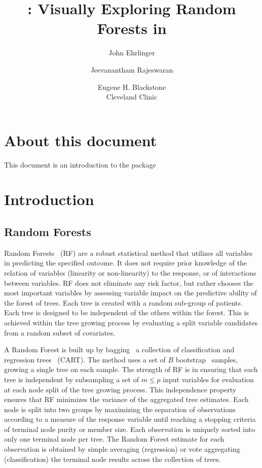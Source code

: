 \documentclass[nojss]{jss}\usepackage[]{graphicx}\usepackage[]{color}
\author{John Ehrlinger \and Jeevanantham Rajeswaran
\and Eugene H. Blackstone\\Cleveland Clinic}
\title{{\pkg{ggRandomForests}}: Visually Exploring Random Forests in \proglang{R}}
\begin{document}



\section{About this document}
This document is an introduction to the  package

\section{Introduction} \label{S:introduction}


\subsection{Random Forests}\label{S:rf}
Random Forests~\citep{Breiman:2001} (RF) are a robust statistical method that utilizes all variables in predicting the specified outcome. It does not require prior knowledge of the relation of variables (linearity or non-linearity) to the response, or of interactions between variables. RF does not eliminate any risk factor, but rather chooses the most important variables by assessing variable impact on the predictive ability of the forest of trees. Each tree is created with a random sub-group of patients. Each tree is designed to be independent of the others within the forest. This is achieved within the tree growing process by evaluating a split variable candidates from a random subset of covariates.

A Random Forest is built up by bagging~\citep{Breiman:1996} a collection of classification and regression trees~\citep{cart:1984} (CART). The method uses a set of $B$ bootstrap~\citep{bootstrap:1994} samples, growing a single tree on each sample. The strength of RF is in ensuring that each tree is independent by subsampling a set of $m \le p$ input variables for evaluation at each node split of the tree growing process. This independence property ensures that RF minimizes the variance of the aggregated tree estimates. Each node is split into two groups by maximizing the separation of observations according to a measure of the response variable until reaching a stopping criteria of terminal node purity or member size. Each observation is uniquely sorted into only one terminal node per tree. The Random Forest estimate for each observation is obtained by simple averaging (regression) or vote aggregating (classification) the terminal node results across the collection of trees. 
\end{document}
